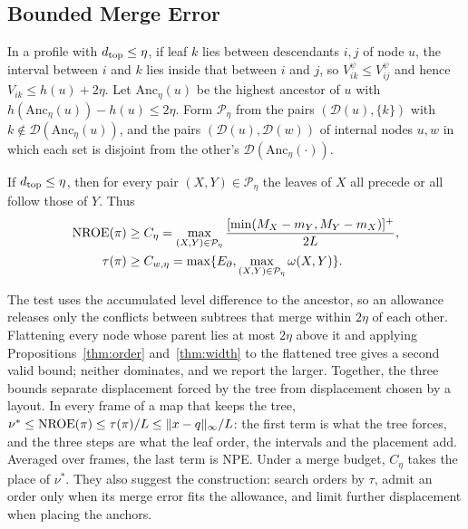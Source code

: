 \subsection{Bounded Merge Error}
In a profile with $d_{\mathrm{top}}\le\eta$, if leaf $k$ lies between descendants $i,j$ of node $u$, the interval between $i$ and $k$ lies inside that between $i$ and $j$, so $V_{ik}^{\psi}\le V_{ij}^{\psi}$ and hence $V_{ik}\le h(u)+2\eta$. Let $\mathrm{Anc}_\eta(u)$ be the highest ancestor of $u$ with $h(\mathrm{Anc}_\eta(u))-h(u)\le2\eta$. Form $\mathcal P_\eta$ from the pairs $(\mathcal D(u),\{k\})$ with $k\notin\mathcal D(\mathrm{Anc}_\eta(u))$, and the pairs $(\mathcal D(u),\mathcal D(w))$ of internal nodes $u,w$ in which each set is disjoint from the other's $\mathcal D(\mathrm{Anc}_\eta(\cdot))$.
\begin{proposition}\label{thm:chain}
If $d_{\mathrm{top}}\le\eta$, then for every pair $(X,Y)\in\mathcal P_\eta$ the leaves of $X$ all precede or all follow those of $Y$. Thus
\begin{equation}\label{eq:chainbounds}
\begin{split}
\mathrm{NROE}(\pi)&\ge C_\eta=\max_{(X,Y)\in\mathcal P_\eta}\frac{[\min(M_X-m_Y,M_Y-m_X)]^+}{2L},\\
\tau(\pi)&\ge C_{w,\eta}=\max\{E_\partial,\max_{(X,Y)\in\mathcal P_\eta}\omega(X,Y)\}.
\end{split}
\end{equation}
\end{proposition}
The test uses the accumulated level difference to the ancestor, so an allowance releases only the conflicts between subtrees that merge within $2\eta$ of each other. Flattening every node whose parent lies at most $2\eta$ above it and applying Propositions~\ref{thm:order} and~\ref{thm:width} to the flattened tree gives a second valid bound; neither dominates, and we report the larger. Together, the three bounds separate displacement forced by the tree from displacement chosen by a layout. In every frame of a map that keeps the tree, $\nu^*\le\mathrm{NROE}(\pi)\le\tau(\pi)/L\le\|x-q\|_\infty/L$: the first term is what the tree forces, and the three steps are what the leaf order, the intervals and the placement add. Averaged over frames, the last term is NPE. Under a merge budget, $C_\eta$ takes the place of $\nu^*$. They also suggest the construction: search orders by $\tau$, admit an order only when its merge error fits the allowance, and limit further displacement when placing the anchors.
